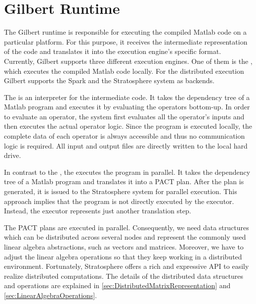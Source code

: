 \chapter{Gilbert Runtime}
\label{cha:gilbertruntime}


The Gilbert runtime is responsible for executing the compiled Matlab code on a particular platform.
For this purpose, it receives the intermediate representation of the code and translates it into the execution engine's specific format.
Currently, Gilbert supports three different execution engines.
One of them is the , which executes the compiled Matlab code locally.
For the distributed execution Gilbert supports the Spark and the Stratosphere system as backends.

The  is an interpreter for the intermediate code.
It takes the dependency tree of a Matlab program and executes it by evaluating the operators bottom-up.
In order to evaluate an operator, the system first evaluates all the operator's inputs and then executes the actual operator logic.
Since the program is executed locally, the complete data of each operator is always accessible and thus no communication logic is required.
All input and output files are directly written to the local hard drive.

In contrast to the , the  executes the program in parallel.
It takes the dependency tree of a Matlab program and translates it into a PACT plan.
After the plan is generated, it is issued to the Stratosphere system for parallel execution.
This approach implies that the program is not directly executed by the executor.
Instead, the executor represents just another translation step.

The PACT plans are executed in parallel.
Consequently, we need data structures which can be distributed across several nodes and represent the commonly used linear algebra abstractions, such as vectors and matrices.
Moreover, we have to adjust the linear algebra operations so that they keep working in a distributed environment.
Fortunately, Stratosphere offers a rich and expressive API to easily realize distributed computations.
The details of the distributed data structures and operations are explained in \cref{sec:DistributedMatrixRepresentation} and \cref{sec:LinearAlgebraOperations}.

